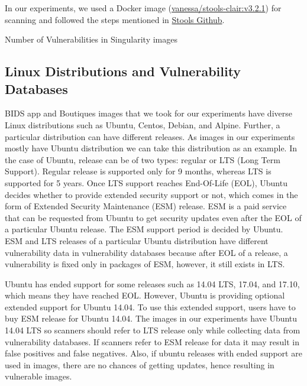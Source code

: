 \documentclass[a4paper,num-refs]{oup-contemporary}
\begin{document}
In our experiments, we used a Docker image (\href{https://hub.docker.com/r/vanessa/stools-clair}{vanessa/stools-clair:v3.2.1})
for scanning and followed the steps mentioned in \href{https://github.com/singularityhub/stools}{Stools Github}.

\begin{table}
%
       \centering
        \caption{\label{sing}Number of Vulnerabilities in Singularity images}
\end{table}

\subsection{Linux Distributions and Vulnerability Databases}

BIDS app and Boutiques images that we took for our experiments have diverse Linux
distributions such as Ubuntu, Centos, Debian, and Alpine. Further, a particular
distribution can have different releases. As images in our experiments mostly have
Ubuntu distribution we can take this distribution as an example. In the case of Ubuntu, release
can be of two types: regular or LTS (Long Term Support).
Regular release is supported only for 9 months, whereas LTS is supported for 5 years. Once LTS support
reaches End-Of-Life (EOL), Ubuntu decides whether to provide extended security support or not, which comes
in the form of Extended Security Maintenance (ESM) release.
ESM is a paid service that can be requested from Ubuntu to get security 
updates even after the EOL of a particular Ubuntu release. The ESM support period is decided by
Ubuntu. ESM and LTS releases of a particular Ubuntu distribution have different vulnerability
data in vulnerability databases because after EOL of a release, a vulnerability is fixed only in packages of ESM, however, it still
exists in LTS.

Ubuntu has ended support for some releases such as 14.04 LTS,
17.04, and 17.10, which means they have reached EOL. However, Ubuntu is providing optional extended support for Ubuntu 14.04.
To use this extended support, users have to buy ESM release for Ubuntu 14.04.
The images in our experiments have Ubuntu 14.04 LTS so scanners should refer
to LTS release only while collecting data from vulnerability databases. If scanners refer to ESM release for data it may result
in false positives and false negatives.
Also, if ubuntu releases with ended support are used in images, there are no chances of getting updates, hence
resulting in vulnerable images. 
\end{document}

